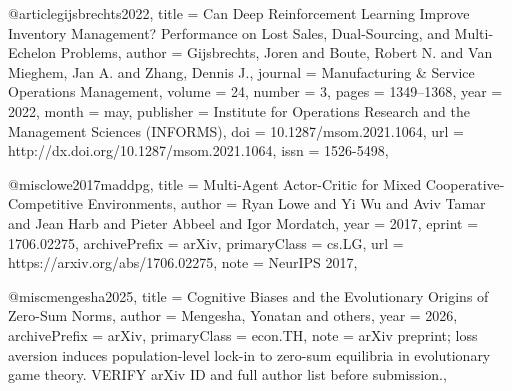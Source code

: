 @article{gijsbrechts2022,
  title     = {Can Deep Reinforcement Learning Improve Inventory Management? {P}erformance on Lost Sales, Dual-Sourcing, and Multi-Echelon Problems},
  author    = {Gijsbrechts, Joren and Boute, Robert N. and Van Mieghem, Jan A. and Zhang, Dennis J.},
  journal   = {Manufacturing \& Service Operations Management},
  volume    = {24},
  number    = {3},
  pages     = {1349--1368},
  year      = {2022},
  month     = may,
  publisher = {Institute for Operations Research and the Management Sciences (INFORMS)},
  doi       = {10.1287/msom.2021.1064},
  url       = {http://dx.doi.org/10.1287/msom.2021.1064},
  issn      = {1526-5498},
}

@misc{lowe2017maddpg,
  title         = {Multi-Agent Actor-Critic for Mixed Cooperative-Competitive Environments},
  author        = {Ryan Lowe and Yi Wu and Aviv Tamar and Jean Harb and Pieter Abbeel and Igor Mordatch},
  year          = {2017},
  eprint        = {1706.02275},
  archivePrefix = {arXiv},
  primaryClass  = {cs.LG},
  url           = {https://arxiv.org/abs/1706.02275},
  note          = {NeurIPS 2017},
}

@misc{mengesha2025,
  title         = {Cognitive Biases and the Evolutionary Origins of Zero-Sum Norms},
  author        = {Mengesha, Yonatan and others},
  year          = {2026},
  archivePrefix = {arXiv},
  primaryClass  = {econ.TH},
  note          = {arXiv preprint; loss aversion induces population-level lock-in to zero-sum equilibria in evolutionary game theory. VERIFY arXiv ID and full author list before submission.},
}